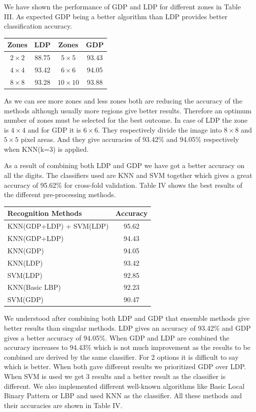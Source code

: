 \documentclass[conference]{IEEEtran}
\begin{document}
We have shown the performance of GDP and LDP for different zones in Table III. As expected GDP being a better algorithm than LDP provides better classification accuracy.
\begin{center}
	\begin{tabular}{cccc}
		\hline
		Zones & LDP & Zones & GDP \\
		\hline
		$2 \times 2$ & 88.75 & $5 \times 5$ & 93.43 \\
		$4 \times 4$ & 93.42 & $6 \times 6$ & 94.05 \\
		$8 \times 8$ & 93.28 & $10 \times 10$ & 93.88 \\
		\hline
	\end{tabular}
\end{center}
As we can see more zones and less zones both are reducing the accuracy of the methods although usually more regions give better results. Therefore an optimum number of zones must be selected for the best outcome. In case of LDP the zone is $4 \times 4$ and for GDP it is $6 \times 6$. They respectively divide the image into $8 \times 8$ and $5 \times 5$ pixel areas. And they give accuracies of 93.42\% and 94.05\% respectively when KNN(k=3) is applied.

As a result of combining both LDP and GDP we have got a better accuracy on all the digits. The classifiers used are KNN and SVM together which gives a great accuracy of 95.62\% for cross-fold validation. Table IV shows the best results of the different pre-processing methods.

\begin{center}
	\begin{tabular}{lc}
		\hline
		Recognition Methods & Accuracy \\
		\hline
		KNN(GDP+LDP) + SVM(LDP) & 95.62\\
		KNN(GDP+LDP) & 94.43\\
		KNN(GDP) & 94.05 \\
		KNN(LDP) & 93.42 \\
		SVM(LDP) & 92.85 \\
		KNN(Basic LBP) & 92.23\\
		SVM(GDP) & 90.47 \\
		\hline
	\end{tabular}
\end{center}

We understood after combining both LDP and GDP that ensemble methods give better results than singular methods. LDP gives an accuracy of 93.42\% and GDP gives a better accuracy of 94.05\%. When GDP and LDP are combined the accuracy increases to 94.43\% which is not much improvement as the results to be combined are derived by the same classifier. For 2 options it is difficult to say which is better. When both gave different results we prioritized GDP over LDP. When SVM is used we get 3 results and a better result as the classifier is different. We also implemented different well-known algorithms like Basic Local Binary Pattern or LBP and used KNN as the classifier. All these methods and their accuracies are shown in Table IV.
\end{document}
